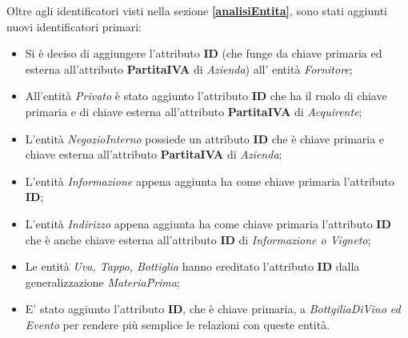 Oltre agli identificatori visti nella sezione \textbf{\ref{analisiEntita}}, sono stati aggiunti nuovi identificatori primari:

\begin{itemize}
	\item Si è deciso di aggiungere l'attributo \textbf{ID} (che funge da chiave primaria ed esterna all'attributo \textbf{PartitaIVA} di \emph{Azienda}) all' entità \emph{Fornitore};
	\item All'entità \emph{Privato} è stato aggiunto l'attributo \textbf{ID} che ha il ruolo di chiave primaria e di chiave esterna all'attributo \textbf{PartitaIVA} di \emph{Acquirente};
	\item L'entità \emph{NegozioInterno} possiede un attributo \textbf{ID} che è chiave primaria e chiave esterna all'attributo \textbf{PartitaIVA} di \emph{Azienda};
	\item L'entità \emph{Informazione} appena aggiunta ha come chiave primaria l'attributo \textbf{ID};
	\item L'entità \emph{Indirizzo} appena aggiunta ha come chiave primaria l'attributo \textbf{ID} che è anche chiave esterna all'attributo \textbf{ID} di \emph{Informazione o Vigneto};
	\item Le entità \emph{Uva, Tappo, Bottiglia} hanno ereditato l'attributo \textbf{ID} dalla generalizzazione \emph{MateriaPrima};
	\item E' stato aggiunto l'attributo \textbf{ID}, che è chiave primaria, a \emph{BottgiliaDiVino ed Evento} per rendere più semplice le relazioni con queste entità.
\end{itemize}